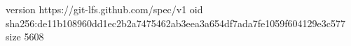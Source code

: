 version https://git-lfs.github.com/spec/v1
oid sha256:de11b108960dd1ec2b2a7475462ab3eea3a654df7ada7fe1059f604129e3c577
size 5608
